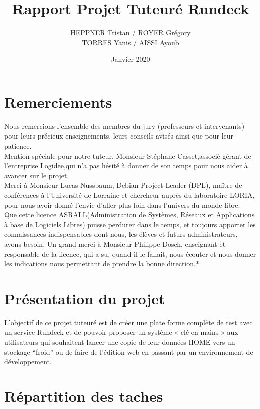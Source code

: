 \documentclass[11pt]{article}
\title{Rapport Projet Tuteuré Rundeck}
\author{HEPPNER Tristan / ROYER Grégory
\\
TORRES Yanis / AISSI Ayoub }
\date{Janvier 2020}
\begin{document}
\maketitle
\newpage
\tableofcontents

\newpage

\section{Remerciements}
Nous remercions l’ensemble des membres du jury (professeurs  et  intervenants) pour leurs précieux enseignements, leurs conseils avisés ainsi que pour leur patience.
\vspace{0.2cm}
\\
Mention  spéciale  pour  notre  tuteur,  Monsieur Stéphane  Casset,associé-gérant  de l'entreprise Logidee,qui n’a pas hésité à donner de son temps pour nous aider à avancer sur le projet.
\vspace{0.2cm}
\\
Merci  à  Monsieur Lucas  Nussbaum,  Debian  Project  Leader  (DPL),  maître  de conférences à l'Université de Lorraine et chercheur auprès du laboratoire LORIA, pour nous avoir donné l’envie d’aller plus loin dans l’univers du monde libre.
\vspace{0.2cm}
\\
Que cette licence ASRALL(Administration de Systèmes, Réseaux et Applications à base  de  Logiciels  Libres)  puisse  perdurer  dans  le  temps,  et  toujours  apporter  les connaissances indispensables dont nous, les élèves et futurs administrateurs, avons besoin. Un grand merci à Monsieur Philippe Dosch, enseignant et responsable de la licence, qui a su, quand il le fallait, nous écouter et nous donner les indications nous permettant de prendre la bonne direction.*

\newpage

\section{Présentation du projet}
L'objectif de ce projet tuteuré est de créer une plate forme complète de test avec un service Rundeck et de pouvoir proposer un système « clé en mains » aux utilisateurs qui souhaitent lancer une copie de leur données HOME vers un stockage “froid” ou de faire de l’édition web en passant par un environnement de développement.

\section{Répartition des taches}
\end{document}
